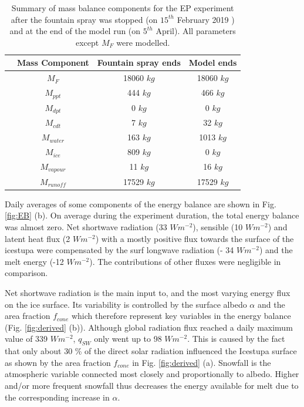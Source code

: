 \documentclass[utf8]{frontiersSCNS} %
\begin{document}
\begin{table} \caption{Summary of mass balance components for the EP experiment after the fountain
  spray was stopped (on $15^{th}$ February 2019 ) and at the end of the model run (on $5^{th}$ April). All parameters
except $M_{F}$ were modelled.} \centering
    \begin{tabular}{|c|c|c|c|} \hline & \multicolumn{1}{c|}{Mass Component} & \multicolumn{1}{c|}{Fountain spray ends}
    & \multicolumn{1}{c|}{Model ends} \\ \hline & $M_F$ & 18060 $kg$ & 18060 $kg$\\
      \parbox{2mm}{} & $M_{ppt}$ & 444 $kg$ & 466 $kg$\\ & $M_{dpt}$ & 0 $kg$ & 0
      $kg$ \\ & $M_{cdt}$ & 7 $kg$ & 32 $kg$ \\
      \hline & $M_{water}$ & 163 $kg$ & 1013 $kg$\\
      \parbox{2mm}{} & $M_{ice}$ & 809 $kg$ & 0 $kg$\\ & $M_{vapour}$ & 11 $kg$ & 16
      $kg$\\ & $M_{runoff}$ & 17529 $kg$ & 17529 $kg$\\
 
 \hline \end{tabular} \label{table:MB} \end{table}


Daily averages of some components of the energy balance are shown in Fig.  \ref{fig:EB} (b). On average during the
experiment duration, the total energy balance was almost zero. Net shortwave radiation (33 $Wm^{-2}$), sensible (10
$Wm^{-2}$) and latent heat flux (2 $Wm^{-2}$) with a mostly positive flux towards the surface of the icestupa were
compensated by the surf longwave radiation (- 34 $Wm^{-2}$) and the melt energy (-12 $Wm^{-2}$). The contributions of
other fluxes were negligible in comparison.

Net shortwave radiation is the main input to, and the most varying energy flux on the ice surface. Its variability is
controlled by the surface albedo $\alpha$ and the area fraction $f_{cone}$ which therefore represent key variables in
the energy balance (Fig. \ref{fig:derived} (b)). Although global radiation flux reached a daily maximum value of 339
$Wm^{-2}$, $q_{SW}$ only went up to 98 $Wm^{-2}$. This is caused by the fact that only about 30 \% of the direct solar
radiation influenced the Icestupa surface as shown by the area fraction $f_{cone}$ in Fig. \ref{fig:derived} (a).
Snowfall is the atmospheric variable connected most closely and proportionally to albedo.  Higher and/or more frequent
snowfall thus decreases the energy available for melt due to the corresponding increase in $\alpha$. 
\end{document}
